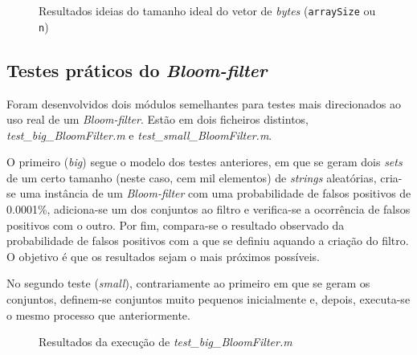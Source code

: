 \documentclass[a4paper,11pt,openright,oneside]{report}
\begin{document}
\begin{figure}[ht]
\center
{}
\caption{Resultados ideias do tamanho ideal do vetor de \textit{bytes} (\texttt{arraySize} ou \texttt{n})}
\label{fig:optimalntext}
\end{figure}

\subsection{Testes práticos do \textit{Bloom-filter}}
\label{subsec.testebloom}

Foram desenvolvidos dois módulos semelhantes para testes mais direcionados ao uso real de um \textit{Bloom-filter}. Estão em dois ficheiros distintos, \textit{test\_big\_BloomFilter.m} e \textit{test\_small\_BloomFilter.m}.

O primeiro (\textit{big}) segue o modelo dos testes anteriores, em que se geram dois \textit{sets} de um certo tamanho (neste caso, cem mil elementos) de \textit{strings} aleatórias, cria-se uma instância de um \textit{Bloom-filter} com uma probabilidade de falsos positivos de 0.0001\%, adiciona-se um dos conjuntos ao filtro e verifica-se a ocorrência de falsos positivos com o outro. Por fim, compara-se o resultado observado da probabilidade de falsos positivos com a que se definiu aquando a criação do filtro. O objetivo é que os resultados sejam o mais próximos possíveis.

No segundo teste (\textit{small}), contrariamente ao primeiro em que se geram os conjuntos, definem-se conjuntos muito pequenos inicialmente e, depois, executa-se o mesmo processo que anteriormente.

\begin{figure}[ht]
\center
{}
\caption{Resultados da execução de \textit{test\_big\_BloomFilter.m}}
\label{fig:testbigbloom}
\end{figure}
\end{document}
